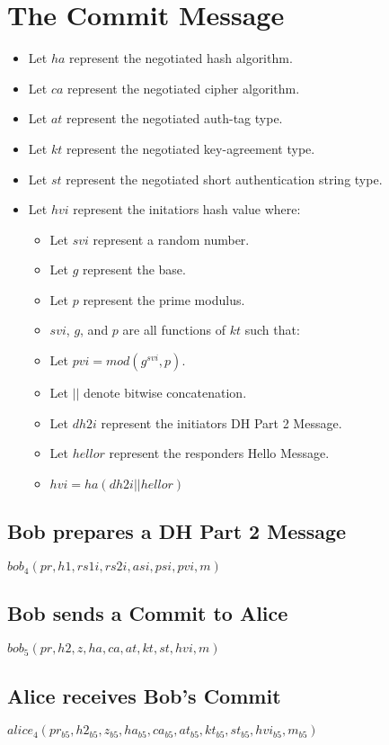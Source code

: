 \documentclass[11pt]{article}
\begin{document}
  \section*{The Commit Message}
  \begin{itemize}
    \item Let $ha$ represent the negotiated hash algorithm.
    \item Let $ca$ represent the negotiated cipher algorithm.
    \item Let $at$ represent the negotiated auth-tag type.
    \item Let $kt$ represent the negotiated key-agreement type.
    \item Let $st$ represent the negotiated short authentication
            string type.
    \item Let $hvi$ represent the initatiors hash value where:
      \begin{itemize}
        \item Let $svi$ represent a random number.
        \item Let $g$ represent the base.
        \item Let $p$ represent the prime modulus.
        \item $svi$, $g$, and $p$ are all functions of $kt$
              such that: 
        \item Let $pvi = mod(g^{svi},p)$.
        \item Let $||$ denote bitwise concatenation.
        \item Let $dh2i$ represent the initiators DH Part 2 Message.
        \item Let $hellor$ represent the responders Hello Message.
        \item $hvi = ha(dh2i || hellor)$
      \end{itemize}
  \end{itemize}
  \subsection*{Bob prepares a DH Part 2 Message}
  $bob_4(pr,h1,rs1i,rs2i,asi,psi,pvi,m)$
  \subsection*{Bob sends a Commit to Alice}
  $bob_5(pr,h2,z,ha,ca,at,kt,st,hvi,m)$
  \subsection*{Alice receives Bob's Commit}
  $alice_4(pr_{b5},h2_{b5},z_{b5},ha_{b5},ca_{b5},at_{b5},kt_{b5}
    ,st_{b5},hvi_{b5},m_{b5})$
\end{document}
